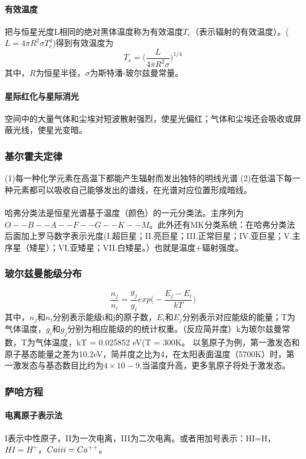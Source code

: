 \documentclass[%
 reprint,
 amsmath,amssymb,
 aps,
]{revtex4-1}
\begin{document}
\paragraph{有效温度}把与恒星光度L相同的绝对黑体温度称为有效温度$T_e$（表示辐射的有效温度）。($L = 4\pi R^2 \sigma T_e^4$)得到有效温度为$$T_e = \big( \frac{L}{4 \pi R^2 \sigma} \big)^{1/4} $$
其中，$R$为恒星半径，$\sigma$为斯特潘-玻尔兹曼常量。

\paragraph{星际红化与星际消光}空间中的大量气体和尘埃对短波散射强烈，使星光偏红；气体和尘埃还会吸收或屏蔽光线，使星光变暗。

\subsubsection{基尔霍夫定律}
(1)每一种化学元素在高温下都能产生辐射而发出独特的明线光谱
(2)在低温下每一种元素都可以吸收自己能够发出的谱线，在光谱对应位置形成暗线。

\paragraph{}哈弗分类法是恒星光谱基于温度（颜色）的一元分类法。主序列为$O--B--A--F--G--K--M$。此外还有MK分类系统：在哈弗分类法后面加上罗马数字表示光度(I.超巨星；II.亮巨星；III.正常巨星；IV.亚巨星；V.主序星（矮星）；VI.亚矮星；VII.白矮星。）也就是温度+辐射强度。

\subsubsection{玻尔兹曼能级分布}
$$\frac{n_j}{n_i} = \frac{g_j}{g_i}exp\big(- \frac{E_j - E_i}{kT}\big) $$
其中，$n_j$和$n_i$分别表示能级i和j的原子数，$E_i$和$E_j$分别表示对应能级的能量；T为气体温度，$g_i$和$g_j$分别为相应能级的的统计权重。（反应简并度）k为玻尔兹曼常数，T为气体温度，kT = 0.025852 eV(T = 300K。
以氢原子为例，第一激发态和原子基态能量之差为10.2eV，简并度之比为4，在太阳表面温度（5700K）时，第一激发态与基态数目比约为$4\times 10^{}-9$,当温度升高，更多氢原子将处于激发态。

\subsubsection{萨哈方程}
\paragraph{电离原子表示法}I表示中性原子，II为一次电离，III为二次电离。或者用加号表示：HI=H，$HI=H^+$，$Ca\uppercase\expandafter{\romannumeral3} = Ca^{++}$。
\end{document}

